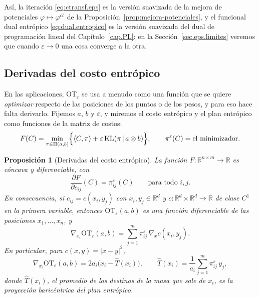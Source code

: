 \documentclass[12pt, a4paper]{amsbook}
\newcommand{\R}{{\mathbb R}}
\newtheorem{prop}[teo]{Proposición}
\theoremstyle{remark}
\theoremstyle{definition}
\numberwithin{section}{chapter}
\numberwithin{subsection}{section}
\numberwithin{equation}{section}
\numberwithin{figure}{chapter}
\begin{document}
Así, la iteración \eqref{eq:ctransf.eps} es la versión suavizada de
la mejora de potenciales $\varphi\mapsto\varphi^{c\bar c}$ de la
Proposición~\ref{prop:mejora-potenciales}, y el funcional dual entrópico
\eqref{eq:dual.entropico} es la versión suavizada del dual de programación
lineal del Capítulo~\ref{cap.PL}: en la Sección~\ref{sec.eps.limites} veremos
que cuando $\varepsilon\to0$ una cosa converge a la otra.

\subsection*{Derivadas del costo entrópico}

En las aplicaciones, $\mathrm{OT}_\varepsilon$ se usa a menudo como una
función que se quiere \emph{optimizar} respecto de las posiciones de los
puntos o de los pesos, y para eso hace falta derivarlo. Fijemos $a$, $b$ y
$\varepsilon$, y miremos el costo entrópico y el plan entrópico como
funciones de la matriz de costos:
\[
F(C)=\min_{\pi\in\Pi(a,b)}\Bigl\{\langle C,\pi\rangle+\varepsilon\,\mathrm{KL}(\pi\,|\,a\otimes b)\Bigr\},
\qquad
\pi^\varepsilon(C)=\text{el minimizador}.
\]

\begin{prop}[Derivadas del costo entrópico]\label{prop.OTeps.derivada}
La función $F\colon\R^{n\times m}\to\R$ es cóncava y diferenciable, con
\[
\frac{\partial F}{\partial c_{ij}}(C)=\pi^\varepsilon_{ij}(C)
\qquad\text{para todo }i,j.
\]
En consecuencia, si $c_{ij}=c(x_i,y_j)$ con $x_i,y_j\in\R^d$ y
$c\colon\R^d\times\R^d\to\R$ de clase $C^1$ en la primera variable, entonces
$\mathrm{OT}_\varepsilon(a,b)$ es una función diferenciable de las
posiciones $x_1,\dots,x_n$, y
\[
\nabla_{x_i}\mathrm{OT}_\varepsilon(a,b)=\sum_{j=1}^m\pi^\varepsilon_{ij}\,\nabla_xc(x_i,y_j).
\]
En particular, para $c(x,y)=|x-y|^2$,
\[
\nabla_{x_i}\mathrm{OT}_\varepsilon(a,b)=2a_i\bigl(x_i-\widehat T(x_i)\bigr),
\qquad
\widehat T(x_i)=\frac1{a_i}\sum_{j=1}^m\pi^\varepsilon_{ij}\,y_j,
\]
donde $\widehat T(x_i)$, el promedio de los destinos de la masa que sale de
$x_i$, es la \emph{proyección baricéntrica} del plan entrópico.
\end{prop}
\end{document}
